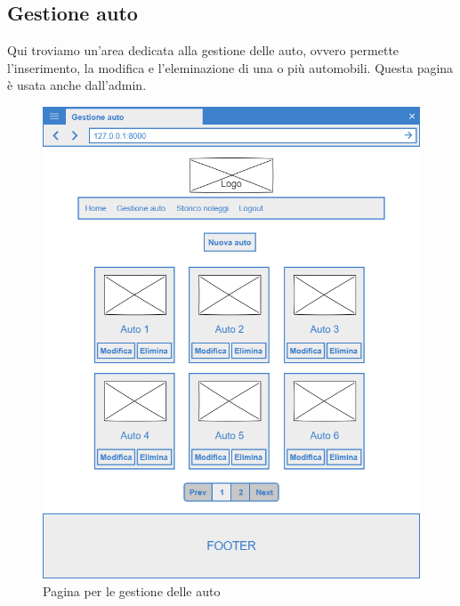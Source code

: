 \documentclass[12pt,a4paperS]{report}
\begin{document}
\begin{normalsize}
			\subsection{Gestione auto}
				Qui troviamo un'area dedicata alla gestione delle auto, ovvero permette l'inserimento, la modifica e l'eleminazione di una o più automobili.
				\newline
				Questa pagina è usata anche dall'admin.
				\begin{figure}[H]
					\centering
					\includegraphics[width=1\textwidth, height=1\textheight, keepaspectratio]{Mockup/Gestione_auto.png}
					\caption{Pagina per le gestione delle auto}
				\end{figure}
			

\end{normalsize}
\end{document}
